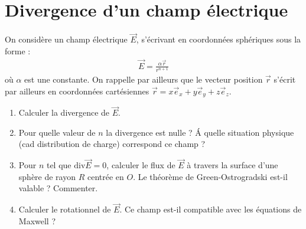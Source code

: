 \newpage

\section{Divergence d'un champ électrique}

On considère un champ électrique $\vec{E}$, s'écrivant en coordonnées sphériques sous la forme :
\begin{align*}
  \vec{E}=\frac{\alpha\vec{r}}{r^{n+1}}
\end{align*}
où $\alpha$ est une constante. On rappelle par ailleurs que le vecteur position $\vec{r}$ s'écrit par ailleurs en coordonnées cartésiennes $\vec{r}=x\vec{e}_x+y\vec{e}_y+z\vec{e}_z$.

\begin{enumerate}

	\item Calculer la divergence de $\vec{E}$.
	
	\item Pour quelle valeur de $n$ la divergence est nulle ? \'A quelle situation physique (cad distribution de charge) correspond ce champ ? 
	
	\item Pour $n$ tel que $\mathrm{div}\vec{E}=0$, calculer le flux de $\vec{E}$ à travers la surface d'une sphère de rayon $R$ centrée en $O$. Le théorème de Green-Ostrogradski est-il valable ? Commenter.
	
	\item Calculer le rotationnel de $\vec{E}$. Ce champ est-il compatible avec les équations de Maxwell ?

\end{enumerate}

\newpage

